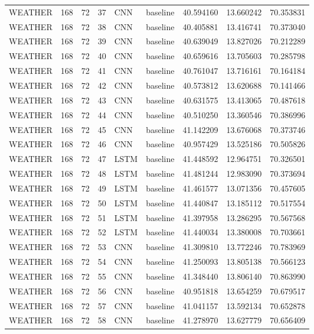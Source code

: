 \begin{table}
\begin{tabular}{lrrrllrrr}
WEATHER & 168 & 72 & 37 & CNN & baseline & 40.594160 & 13.660242 & 70.353831 \\
WEATHER & 168 & 72 & 38 & CNN & baseline & 40.405881 & 13.416741 & 70.373040 \\
WEATHER & 168 & 72 & 39 & CNN & baseline & 40.639049 & 13.827026 & 70.212289 \\
WEATHER & 168 & 72 & 40 & CNN & baseline & 40.659616 & 13.705603 & 70.285798 \\
WEATHER & 168 & 72 & 41 & CNN & baseline & 40.761047 & 13.716161 & 70.164184 \\
WEATHER & 168 & 72 & 42 & CNN & baseline & 40.573812 & 13.620688 & 70.141466 \\
WEATHER & 168 & 72 & 43 & CNN & baseline & 40.631575 & 13.413065 & 70.487618 \\
WEATHER & 168 & 72 & 44 & CNN & baseline & 40.510250 & 13.360546 & 70.386996 \\
WEATHER & 168 & 72 & 45 & CNN & baseline & 41.142209 & 13.676068 & 70.373746 \\
WEATHER & 168 & 72 & 46 & CNN & baseline & 40.957429 & 13.525186 & 70.505826 \\
WEATHER & 168 & 72 & 47 & LSTM & baseline & 41.448592 & 12.964751 & 70.326501 \\
WEATHER & 168 & 72 & 48 & LSTM & baseline & 41.481244 & 12.983090 & 70.373694 \\
WEATHER & 168 & 72 & 49 & LSTM & baseline & 41.461577 & 13.071356 & 70.457605 \\
WEATHER & 168 & 72 & 50 & LSTM & baseline & 41.440847 & 13.185112 & 70.517554 \\
WEATHER & 168 & 72 & 51 & LSTM & baseline & 41.397958 & 13.286295 & 70.567568 \\
WEATHER & 168 & 72 & 52 & LSTM & baseline & 41.440034 & 13.380008 & 70.703661 \\
WEATHER & 168 & 72 & 53 & CNN & baseline & 41.309810 & 13.772246 & 70.783969 \\
WEATHER & 168 & 72 & 54 & CNN & baseline & 41.250093 & 13.805138 & 70.566123 \\
WEATHER & 168 & 72 & 55 & CNN & baseline & 41.348440 & 13.806140 & 70.863990 \\
WEATHER & 168 & 72 & 56 & CNN & baseline & 40.951818 & 13.654259 & 70.679517 \\
WEATHER & 168 & 72 & 57 & CNN & baseline & 41.041157 & 13.592134 & 70.652878 \\
WEATHER & 168 & 72 & 58 & CNN & baseline & 41.278970 & 13.627779 & 70.656409 \\

\end{tabular}
\end{table}
